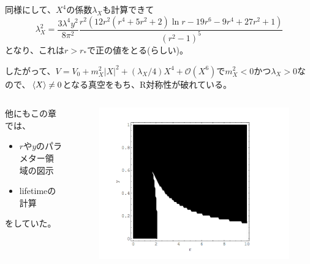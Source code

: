 \documentclass[
  unicode,a4paper,9pt,
  xcolor = {dvipsnames,svgnames},
  hyperref ={colorlinks=true,citecolor=Navy,linkcolor=NavyBlue,urlcolor=purple},
  ja=standard,lualatex
]{beamer}
\begin{document}
\begin{frame}

  同様にして、$X^{4}$の係数$\lambda_{X}$も計算できて
  \begin{equation}
    \lambda_{X}^2
    =
    \frac{3\lambda^4 y^2}{8\pi^2}
    \dfrac{r^2(12r^2(r^4+5r^2+2)\ln r-19r^6-9r^4+27r^2+1)}{(r^2-1)^5}
    \nonumber
  \end{equation}
  となり、これは$r>r_{*}$で正の値をとる(らしい)。

  したがって、$V=V_{0}+m_{X}^2|X|^2+(\lambda_{X}/4)X^4+\mathcal{O}(X^6)$で$m_{X}^2<0$かつ$\lambda_{X}>0$なので、$\ev*{X}\neq 0$となる真空をもち、R対称性が破れている。

  \vspace*{15pt}
  
  \begin{columns}[t]
    \begin{column}{0.5\textwidth}
      他にもこの章では、
      \begin{itemize}
        \item 
        $r$や$y$のパラメター領域の図示
        \item 
        lifetimeの計算 
      \end{itemize}
      をしていた。
    \end{column}
    \begin{column}{0.5\textwidth} 

      \vspace*{-30pt}

      \begin{figure}
        \centering
        \includegraphics[width=1.0\textwidth]{fig/01.PNG}
      \end{figure}
    \end{column}
  \end{columns}

\end{frame}
\end{document}
